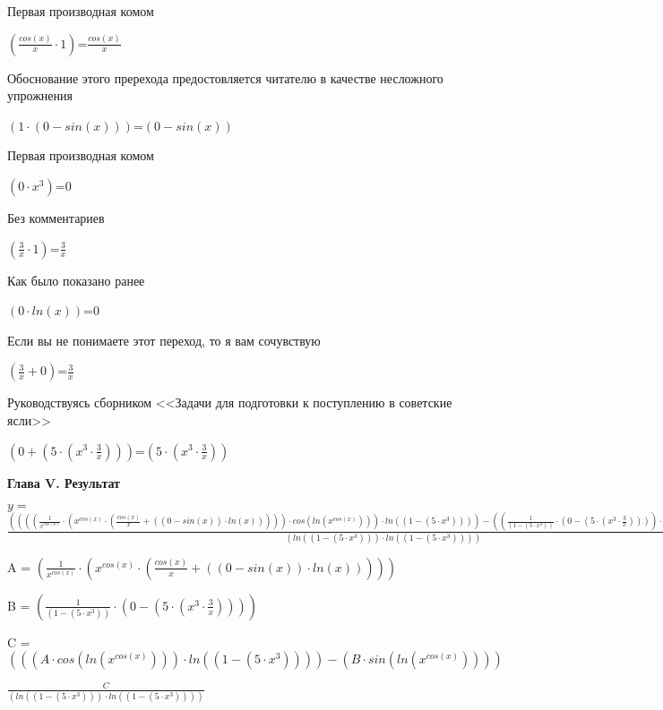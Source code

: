 \documentclass[12pt,a4paper,fleqn]{article}
\begin{document}
Первая производная комом

\begin{center}
$(\frac{cos(x)}{x} \cdot 1)$=$\frac{cos(x)}{x}$\end{center}
Обоснование этого пререхода предостовляется читателю в качестве несложного упрожнения

\begin{center}
$(1 \cdot (0 - sin(x)))$=$(0 - sin(x))$\end{center}
Первая производная комом

\begin{center}
$(0 \cdot x^{3})$=$0$\end{center}
Без комментариев

\begin{center}
$(\frac{3}{x} \cdot 1)$=$\frac{3}{x}$\end{center}
Как было показано ранее

\begin{center}
$(0 \cdot ln(x))$=$0$\end{center}
Если вы не понимаете этот переход, то я вам сочувствую

\begin{center}
$(\frac{3}{x} + 0)$=$\frac{3}{x}$\end{center}
Руководствуясь сборником <<Задачи для подготовки к поступлению в советские ясли>>

\begin{center}
$(0 + (5 \cdot (x^{3} \cdot \frac{3}{x})))$=$(5 \cdot (x^{3} \cdot \frac{3}{x}))$\end{center}
\newpage \textbf{\LARGE Глава V. Результат}

$y = $$\frac{((((\frac{1}{x^{cos(x)}} \cdot (x^{cos(x)} \cdot (\frac{cos(x)}{x} + ((0 - sin(x)) \cdot ln(x))))) \cdot cos(ln(x^{cos(x)}))) \cdot ln((1 - (5 \cdot x^{3})))) - ((\frac{1}{(1 - (5 \cdot x^{3}))} \cdot (0 - (5 \cdot (x^{3} \cdot \frac{3}{x})))) \cdot sin(ln(x^{cos(x)}))))}{(ln((1 - (5 \cdot x^{3}))) \cdot ln((1 - (5 \cdot x^{3}))))}$\begin{center}
A = $(\frac{1}{x^{cos(x)}} \cdot (x^{cos(x)} \cdot (\frac{cos(x)}{x} + ((0 - sin(x)) \cdot ln(x)))))$\end{center}
\begin{center}
B = $(\frac{1}{(1 - (5 \cdot x^{3}))} \cdot (0 - (5 \cdot (x^{3} \cdot \frac{3}{x}))))$\end{center}
\begin{center}
C = $(((A \cdot cos(ln(x^{cos(x)}))) \cdot ln((1 - (5 \cdot x^{3})))) - (B \cdot sin(ln(x^{cos(x)}))))$\end{center}
$\frac{C}{(ln((1 - (5 \cdot x^{3}))) \cdot ln((1 - (5 \cdot x^{3}))))}$
\end{document}
